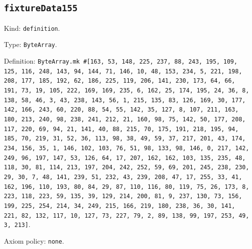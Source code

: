 \documentclass[11pt]{article}
\begin{document}
\subsection*{\texttt{fixtureData155}}
\noindent Kind: \texttt{definition}.\par
\noindent Type: \texttt{ByteArray}.\par
\noindent Definition: \texttt{ByteArray.mk \#[163, 53, 148, 225, 237, 88, 243, 195, 109, 125, 116, 248, 143, 94, 144, 71, 146, 10, 48, 153, 234, 5, 221, 198, 208, 177, 185, 192, 62, 186, 225, 119, 206, 141, 230, 173, 64, 66, 191, 73, 19, 105, 222, 169, 169, 235, 6, 162, 25, 174, 195, 24, 36, 8, 138, 58, 46, 3, 43, 238, 143, 56, 1, 215, 135, 83, 126, 169, 30, 177, 142, 166, 243, 60, 220, 88, 54, 55, 142, 35, 127, 8, 107, 211, 163, 180, 213, 240, 98, 238, 241, 212, 21, 160, 98, 75, 142, 50, 177, 208, 117, 220, 69, 94, 21, 141, 40, 88, 215, 70, 175, 191, 218, 195, 94, 185, 70, 219, 31, 52, 36, 113, 98, 38, 49, 59, 37, 217, 201, 43, 174, 234, 156, 35, 1, 146, 102, 103, 76, 51, 98, 133, 98, 146, 0, 217, 142, 249, 96, 197, 147, 53, 126, 64, 17, 207, 162, 162, 103, 135, 235, 48, 118, 30, 81, 114, 213, 197, 204, 242, 252, 59, 69, 201, 245, 238, 230, 29, 30, 7, 48, 141, 239, 51, 232, 43, 239, 208, 47, 17, 255, 33, 41, 162, 196, 110, 193, 80, 84, 29, 87, 110, 116, 80, 119, 75, 26, 173, 8, 223, 118, 223, 59, 135, 39, 129, 214, 200, 81, 9, 237, 130, 73, 156, 199, 225, 254, 214, 34, 249, 215, 166, 219, 180, 238, 36, 30, 141, 221, 82, 132, 117, 10, 127, 73, 227, 79, 2, 89, 138, 99, 197, 253, 49, 3, 213]}.\par
\noindent Axiom policy: \texttt{none}.\par
\end{document}
